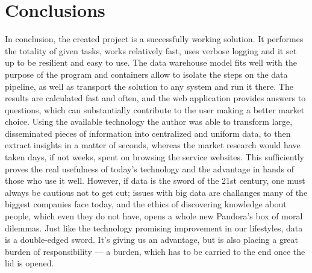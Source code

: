 \section{Conclusions}
In conclusion, the created project is a successfully working solution. It performes the totality of given tasks, works relatively fast, uses verbose logging and it set up to be resilient and easy to use. The data warehouse model fits well with the purpose of the program and containers allow to isolate the steps on the data pipeline, as well as transport the solution to any system and run it there. The results are calculated fast and often, and the web application provides answers to questions, which can substantially contribute to the user making a better market choice. Using the available technology the author was able to transform large, disseminated pieces of information into centralized and uniform data, to then extract insights in a matter of seconds, whereas the market research would have taken days, if not weeks, spent on browsing the service websites. This sufficiently proves the real usefulness of today's technology and the advantage in hands of those who use it well. However, if data is the sword of the 21st century, one must always be cautious not to get cut; issues with big data are challanges many of the biggest companies face today, and the ethics of discovering knowledge about people, which even they do not have, opens a whole new Pandora's box of moral dilemmas. Just like the technology promising improvement in our lifestyles, data is a double-edged sword. It's giving us an advantage, but is also placing a great burden of responsibility --- a burden, which has to be carried to the end once the lid is opened.
